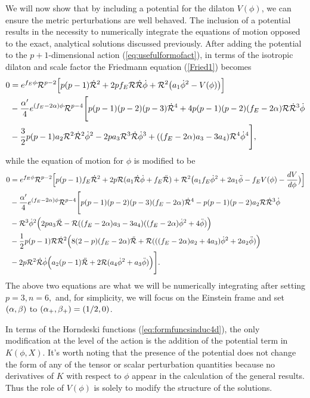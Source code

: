 \documentclass[amsmath,amssymb,11pt]{article}
\begin{document}
We will now show that by including a potential for the dilaton $V(\phi)$, we can ensure the metric perturbations are well behaved. The inclusion of a potential results in the necessity to numerically integrate the equations of motion opposed to the exact, analytical solutions discussed previously.  After adding the potential to the $p+1$-dimensional action (\ref{eq:usefulformofact}), in terms of the isotropic dilaton and scale factor the Friedmann equation (\ref{Fried1}) becomes
\begin{equation}\label{FriedWithPot}
\begin{split}
0&=e^{f_E \phi}\mathcal{R}^{p-2}\Big[p(p-1)\dot{\mathcal{R}}^2 +2pf_E \mathcal{R}\dot{\mathcal{R}}\dot{\phi}+\mathcal{R}^2\big(a_1\dot{\phi}^2-V(\phi)\big) \Big] \\
&-\frac{\alpha'}{4}e^{(f_E-2\alpha)\phi}\mathcal{R}^{p-4}\Bigg[p(p-1)(p-2)(p-3)\dot{\mathcal{R}}^4+4p(p-1)(p-2)(f_E-2\alpha)\mathcal{R}\dot{\mathcal{R}}^3\dot{\phi} \\
&-\frac{3}{2}p(p-1)a_2\mathcal{R}^2\dot{\mathcal{R}}^2\dot{\phi}^2 
-2pa_3\mathcal{R}^3\dot{\mathcal{R}}\dot{\phi}^3+((f_E-2\alpha)a_3-3a_4)\mathcal{R}^4\dot{\phi}^4\Bigg],
\end{split}
\end{equation}
while the equation of motion for $\phi$ is modified to be 
\begin{equation}\label{phiWithPot}
\begin{split} 
0&=e^{f_E\phi}\mathcal{R}^{p-2}\Big[p(p-1)f_E\dot{\mathcal{R}}^2+2p\mathcal{R}(a_1\dot{\mathcal{R}}\dot{\phi}+f_E\ddot{\mathcal{R}})+\mathcal{R}^2\big(a_1 f_E\dot{\phi}^2+2a_1\ddot{\phi}-f_E V(\phi)-\frac{dV}{d\phi}\big)\Big] \\
&-\frac{\alpha'}{4}e^{(f_E-2\alpha)\phi}\mathcal{R}^{p-4}\Bigg[p(p-1)(p-2)(p-3)(f_E-2\alpha)\dot{\mathcal{R}}^4-p(p-1)(p-2)a_2\mathcal{R}\dot{\mathcal{R}}^3\dot{\phi} \\
&-\mathcal{R}^3\dot{\phi}^2\Big(2pa_3\ddot{\mathcal{R}}-\mathcal{R}((f_E-2\alpha)a_3-3a_4)((f_E-2\alpha)\dot{\phi}^2+4\ddot{\phi})\Big) \\
&-\frac{1}{2}p(p-1)\mathcal{R}\dot{\mathcal{R}}^2\Big(8(2-p)(f_E-2\alpha)\ddot{\mathcal{R}}+\mathcal{R}(((f_E-2\alpha)a_2+4a_3)\dot{\phi}^2+2a_2\ddot{\phi})\Big) \\
&-2p\mathcal{R}^2\dot{\mathcal{R}}\dot{\phi}\Big(a_2(p-1)\ddot{\mathcal{R}}+2\mathcal{R}(a_4\dot{\phi}^2+a_3\ddot{\phi})\Big)\Bigg].
\end{split}
\end{equation}
The above two equations are what we will be numerically integrating after setting $p=3,n=6,$ and, for simplicity, we will focus on the Einstein frame and set $(\alpha,\beta)$ to $(\alpha_+,\beta_+)=(1/2,0)$.

In terms of the Horndeski functions (\ref{eq:formfuncsinduc4d}), the only modification at the level of the action is the addition of the potential term in $K(\phi,X)$. It's worth noting that the presence of the potential does not change the form of any of the tensor or scalar perturbation quantities because no derivatives of $K$ with respect to $\phi$ appear in the calculation of the general results. Thus the role of $V(\phi)$ is solely to modify the structure of the solutions. 
\end{document}
